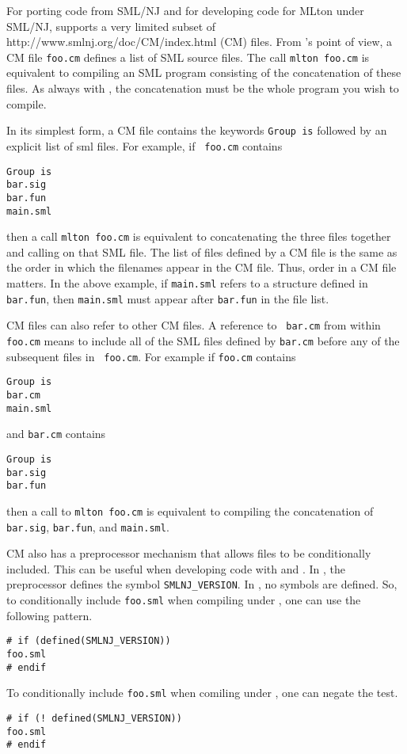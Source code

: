 %
For porting code from SML/NJ and for developing code for MLton under
SML/NJ, {\mlton} supports a very limited subset of
                  {http://www.smlnj.org/doc/CM/index.html}
(CM) files.  From {\mlton}'s point of view, a CM file {\tt foo.cm}
defines a list of SML source files.  The call {\tt mlton foo.cm} is
equivalent to compiling an SML program consisting of the concatenation
of these files.  As always with {\mlton}, the concatenation must be
the whole program you wish to compile.

In its simplest form, a CM file contains the keywords {\tt Group is}
followed by an explicit list of sml files.  For example, if {\tt
foo.cm} contains
\begin{verbatim}
Group is
bar.sig
bar.fun
main.sml
\end{verbatim}
then a call {\tt mlton foo.cm} is equivalent to concatenating the
three files together and calling {\mlton} on that SML file.  The list
of files defined by a CM file is the same as the order in which the
filenames appear in the CM file.  Thus, order in a CM file matters.
In the above example, if {\tt main.sml} refers to a structure defined
in {\tt bar.fun}, then {\tt main.sml} must appear after {\tt bar.fun}
in the file list.

CM files can also refer to other CM files.  A reference to {\tt
bar.cm} from within {\tt foo.cm} means to include all of the SML files
defined by {\tt bar.cm} before any of the subsequent files in {\tt
foo.cm}.  For example if {\tt foo.cm} contains
\begin{verbatim}
Group is
bar.cm
main.sml
\end{verbatim}
and {\tt bar.cm} contains
\begin{verbatim}
Group is
bar.sig
bar.fun
\end{verbatim}
then a call to {\tt mlton foo.cm} is equivalent to compiling the
concatenation of {\tt bar.sig}, {\tt bar.fun}, and {\tt main.sml}.

CM also has a preprocessor mechanism that allows files to be
conditionally included.  This can be useful when developing code with
{\smlnj} and {\mlton}.  In {\smlnj}, the preprocessor defines the
symbol {\tt SMLNJ\_VERSION}.  In {\mlton}, no symbols are defined.
So, to conditionally include {\tt foo.sml} when compiling under
{\smlnj}, one can use the following pattern.
\begin{verbatim}
# if (defined(SMLNJ_VERSION))
foo.sml
# endif
\end{verbatim}
To conditionally include {\tt foo.sml} when comiling under {\mlton}, one can
negate the test.
\begin{verbatim}
# if (! defined(SMLNJ_VERSION))
foo.sml
# endif
\end{verbatim}


